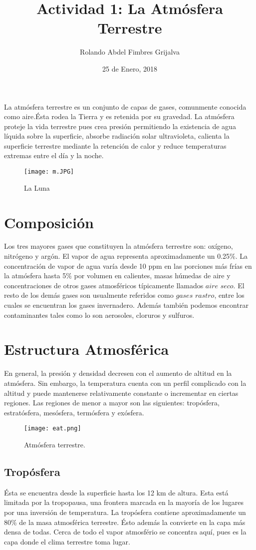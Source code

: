 \documentclass{article}
\title{Actividad 1: La Atmósfera Terrestre}
\author{Rolando Abdel Fimbres Grijalva}
\date{25 de Enero, 2018}
\begin{document}
La atmósfera terrestre es un conjunto de capas de gases, comunmente conocida como aire.Ésta rodea la Tierra y es retenida por su gravedad. La atmósfera proteje la vida terrestre pues crea presión permitiendo la existencia de agua líquida sobre la superficie, absorbe radiación solar ultravioleta, calienta la superficie terrestre mediante la retención de calor y reduce temperaturas extremas entre el día y la noche.

\begin{figure}[h!]
    \texttt{[image: m.JPG]}
    \caption{La Luna}
\end{figure}

\section{Composición}
Los tres mayores gases que constituyen la atmósfera terrestre son: oxígeno, nitrógeno y argón. El vapor de agua representa aproximadamente un 0.25\%. La concentración de vapor de agua varía desde 10 ppm en las porciones más frías en la atmósfera hasta 5\% por volumen en calientes, masas húmedas de aire y concentraciones de otros gases atmosféricos típicamente llamados $aire$ $seco$.
El resto de los demás gases son usualmente referidos como $gases$ $rastro$, entre los cuales se encuentran los gases invernadero. Además también podemos encontrar contaminantes tales como lo son aerosoles, cloruros y sulfuros.

\section{Estructura Atmosférica}
En general, la presión y densidad decresen con el aumento de altitud en la atmósfera. Sin embargo, la temperatura cuenta con un perfil complicado con la altitud y puede mantenerse relativamente constante o incrementar en ciertas regiones. Las regiones de menor a mayor son las siguientes: tropósfera, estratósfera, mesósfera, termósfera y exósfera.

\begin{figure}[h!]
    \texttt{[image: eat.png]}
    \caption{Atmósfera terrestre.}
\end{figure}

\subsection{Tropósfera}
Ésta se encuentra desde la superficie hasta los 12 km de altura. Esta está limitada por la tropopausa, una frontera marcada en la mayoría de los lugares por una inversión de temperatura. La tropósfera contiene aproximadamente un 80\% de la masa atmosférica terrestre. Ésto además la convierte en la capa más densa de todas. Cerca de todo el vapor atmosfério se concentra aquí, pues es la capa donde el clima terrestre toma lugar.
\end{document}
